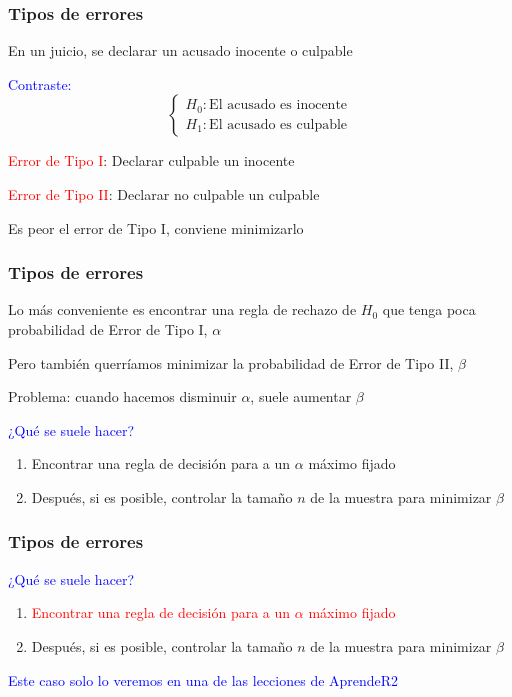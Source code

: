 \documentclass[12pt,t]{beamer}\usepackage[]{graphicx}\usepackage[]{color}
\newcommand{\red}[1]{\textcolor{red}{#1}}
\newcommand{\blue}[1]{\textcolor{blue}{#1}}
\theoremstyle{plain}
\theoremstyle{definition}
\begin{document}
\begin{frame}
\frametitle{Tipos de errores}

En un juicio, se  declarar un acusado inocente o culpable
\medskip

\blue{Contraste:}
$$
\left\{\begin{array}{ll} 
H_{0}:\mbox{El acusado es inocente}\\ 
H_{1}:\mbox{El  acusado es culpable}
\end{array}
\right.
$$
\medskip

 \red{Error de Tipo I}: Declarar culpable un inocente
\medskip

 \red{Error de Tipo II}: Declarar no culpable un culpable
\medskip

 Es peor el error de Tipo I, conviene minimizarlo
\end{frame}


\begin{frame}
\frametitle{Tipos de errores}

 Lo más conveniente es encontrar una regla de rechazo de $H_{0}$ que tenga poca
probabilidad de Error de Tipo I, $\alpha$
\medskip

 Pero también querríamos minimizar la probabilidad  de Error de Tipo II, $\beta$
\medskip

 Problema:  cuando hacemos disminuir $\alpha$, suele aumentar $\beta$
\medskip

\blue{¿Qué se suele hacer?} 
\begin{enumerate}
\item Encontrar una regla de decisión para a un $\alpha$ máximo fijado
\item Después, si es posible, controlar la tamaño $n$ de la muestra para minimizar $\beta$
\end{enumerate}
\end{frame}

\begin{frame}

\frametitle{Tipos de errores}

\blue{¿Qué se suele hacer?} 

\begin{enumerate}
\item \red{Encontrar una regla de decisión para a un $\alpha$ máximo fijado}
\item Después, si es posible, controlar la tamaño $n$ de la muestra para minimizar $\beta$
\end{enumerate}
\blue{Este caso solo lo veremos en una de las  lecciones de AprendeR2}
\end{frame}
\end{document}
